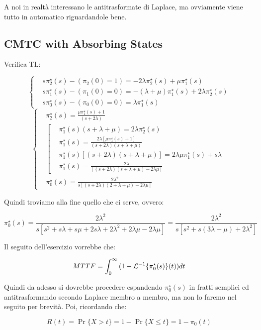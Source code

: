 A noi in realtà interessano le antitrasformate di Laplace, ma ovviamente viene tutto in automatico riguardandole bene.

\subsection{CMTC with Absorbing States}

Verifica TL:

\[
	\left\{
	\begin{aligned}
	&s\pi_2^\star(s) -(\pi_2(0)=1) = -2\lambda\pi_2^\star(s) + \mu\pi_1^\star(s)\\
	&s\pi_1^\star(s) -(\pi_1(0)=0) = -(\lambda+\mu)\pi_1^\star(s) + 2\lambda\pi_2^\star(s)\\
	&s\pi_0^\star(s) -(\pi_0(0)=0) = \lambda\pi_1^\star(s)
	\end{aligned}
	\right.
\]
\[
	\left\{
	\begin{aligned}
	&\pi_2^\star(s) = \frac{\mu\pi_1^\star(s)+1}{(s+2\lambda)}\\
	&\left[
	\begin{aligned}
	&\pi_1^\star(s)(s+\lambda+\mu) = 2\lambda\pi_2^\star(s)\\
	&\pi_1^\star(s) = \frac{2\lambda[\mu\pi_1^\star(s)+1]}{(s+2\lambda)(s+\lambda+\mu)}\\
	&\pi_1^\star(s)[(s+2\lambda)(s+\lambda+\mu)] = 2\lambda\mu\pi_1^\star(s)+s\lambda\\
	&\pi_1^\star(s) = \frac{2\lambda}{[(s+2\lambda)(s+\lambda+\mu)-2\lambda\mu]}
	\end{aligned}
	\right.\\
	&\pi_0^\star(s) = \frac{2\lambda^2}{s[(s+2\lambda)(2+\lambda+\mu) - 2\lambda\mu]}
	\end{aligned}
	\right.
\]

Quindi troviamo alla fine quello che ci serve, ovvero:

\[
	\pi_0^\star(s) = \frac{2\lambda^2}{s[s^2 +s\lambda+s\mu+2s\lambda+2\lambda^2+2\lambda\mu-2\lambda\mu]} = \frac{2\lambda^2}{s[s^2+s(3\lambda+\mu)+2\lambda^2]}
\]

Il seguito dell'esercizio vorrebbe che:

\[
	MTTF = \int_0^\infty{(1-\mathcal{L}^{-1}\{\pi_0^\star(s)\}(t))dt}
\]

Quindi da adesso si dovrebbe procedere espandendo $\pi_0^\star(s)$ in fratti semplici ed antitrasformando secondo Laplace membro a membro, ma non lo faremo nel seguito per brevità. Poi, ricordando che:

\[
	R(t)=\Pr\{X> t\} = 1-\Pr\{X\leq t\} = 1-\pi_0(t)
\]

